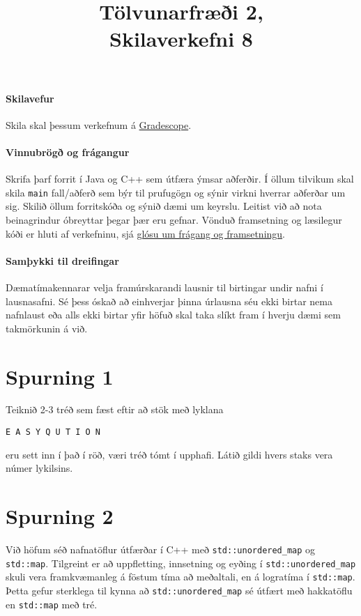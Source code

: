 \documentclass{article}
\title{Tölvunarfræði 2, \semester \\ Skilaverkefni 8}
\author{}
\begin{document}
\maketitle
{}

\paragraph{Skilavefur} Skila skal þessum verkefnum á \href{https://gradescope.com/courses/5640}{Gradescope}.

\paragraph{Vinnubrögð og frágangur} Skrifa þarf forrit í Java og C++ sem útfæra ýmsar aðferðir. Í öllum tilvikum skal skila \texttt{main} fall/aðferð sem býr til prufugögn og sýnir virkni hverrar aðferðar um sig. Skilið öllum forritskóða og sýnið dæmi um keyrslu. Leitist við að nota beinagrindur óbreyttar þegar þær eru gefnar. Vönduð framsetning og læsilegur kóði er hluti af verkefninu, sjá \href{https://piazza.com/class/ixkicfen49l111?cid=52}{glósu um frágang og framsetningu}.

\paragraph{Samþykki til dreifingar} Dæmatímakennarar velja framúrskarandi lausnir til birtingar undir nafni í lausnasafni. Sé þess óskað að einhverjar þinna úrlausna séu ekki birtar nema nafnlaust eða alls ekki birtar yfir höfuð skal taka slíkt fram í hverju dæmi sem takmörkunin á við.

\section{Spurning 1}
Teiknið 2-3 tréð sem fæst eftir að stök með lyklana
\begin{center}
\texttt{E A S Y Q U T I O N} 
\end{center}
eru sett inn í það í röð, væri tréð tómt í upphafi. Látið gildi hvers staks vera númer lykilsins.

\section{Spurning 2}

Við höfum séð nafnatöflur útfærðar í C++ með \texttt{std::unordered\_map} og \texttt{std::map}. Tilgreint er að uppfletting, innsetning og eyðing í \texttt{std::unordered\_map} skuli vera framkvæmanleg á föstum tíma að meðaltali, en á logratíma í \texttt{std::map}. Þetta gefur sterklega til kynna að \texttt{std::unordered\_map} sé útfært með hakkatöflu en \texttt{std::map} með tré.
\end{document}
